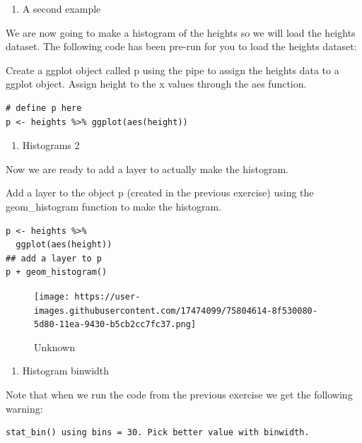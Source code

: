 \documentclass[
]{article}
\providecommand{\tightlist}{%
  \setlength{\itemsep}{0pt}\setlength{\parskip}{0pt}}
\begin{document}
\begin{enumerate}
\def\labelenumi{\arabic{enumi}.}
\setcounter{enumi}{15}
\tightlist
\item
  A second example
\end{enumerate}

We are now going to make a histogram of the heights so we will load the
heights dataset. The following code has been pre-run for you to load the
heights dataset:

Create a ggplot object called p using the pipe to assign the heights
data to a ggplot object. Assign height to the x values through the aes
function.

\begin{verbatim}
# define p here
p <- heights %>% ggplot(aes(height))
\end{verbatim}

\begin{enumerate}
\def\labelenumi{\arabic{enumi}.}
\setcounter{enumi}{16}
\tightlist
\item
  Histograms 2
\end{enumerate}

Now we are ready to add a layer to actually make the histogram.

Add a layer to the object p (created in the previous exercise) using the
geom\_histogram function to make the histogram.

\begin{verbatim}
p <- heights %>% 
  ggplot(aes(height))
## add a layer to p
p + geom_histogram()
\end{verbatim}

\begin{figure}
\centering
\texttt{[image: https://user-images.githubusercontent.com/17474099/75804614-8f530080-5d80-11ea-9430-b5cb2cc7fc37.png]}
\caption{Unknown}
\end{figure}

\begin{enumerate}
\def\labelenumi{\arabic{enumi}.}
\setcounter{enumi}{17}
\tightlist
\item
  Histogram binwidth
\end{enumerate}

Note that when we run the code from the previous exercise we get the
following warning:

\begin{verbatim}
stat_bin() using bins = 30. Pick better value with binwidth.
\end{verbatim}
\end{document}
